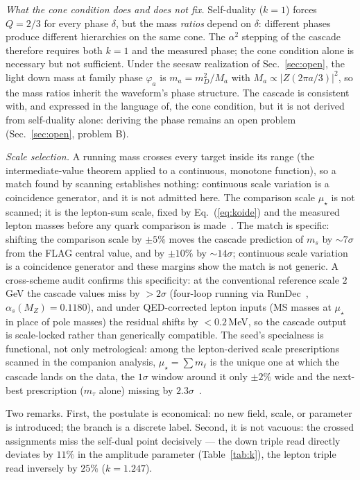 \documentclass[11pt]{article}
\begin{document}
\emph{What the cone condition does and does not fix.} Self-duality ($k=1$)
forces $Q = 2/3$ for every phase $\delta$, but the mass \emph{ratios} depend
on $\delta$: different phases produce different hierarchies on the same cone.
The $\alpha^2$ stepping of the cascade therefore requires both $k=1$ and the
measured phase; the cone condition alone is necessary but not sufficient.
Under the seesaw realization of Sec.~\ref{sec:open}, the light down mass at
family phase $\varphi_a$ is $m_a = m_D^2/M_a$ with
$M_a \propto |Z(2\pi a/3)|^2$, so the mass ratios inherit the waveform's
phase structure. The cascade is consistent with, and expressed in the
language of, the cone condition, but it is not derived from self-duality
alone: deriving the phase remains an open problem (Sec.~\ref{sec:open},
problem B).

\emph{Scale selection.} A running mass crosses every target inside its range
(the intermediate-value theorem applied to a continuous, monotone function),
so a match found by scanning establishes nothing: continuous scale variation
is a coincidence generator, and it is not admitted here. The comparison
scale $\mu_\star$ is not scanned; it is the lepton-sum scale, fixed by
Eq.~(\ref{eq:koide}) and the measured lepton masses before any quark
comparison is made~\cite{APPB}. The match is specific: shifting the comparison scale by $\pm5\%$ moves the cascade prediction of $m_s$ by $\sim7\sigma$ from the FLAG central value, and by $\pm10\%$ by $\sim14\sigma$; continuous scale variation is a coincidence generator and these margins show the match is not generic. A cross-scheme audit confirms this specificity: at the conventional
reference scale $2$\,GeV the cascade values miss by $>2\sigma$
(four-loop running via RunDec~\cite{CRunDec}, $\alpha_s(M_Z)=0.1180$),
and under QED-corrected lepton inputs (MS masses at $\mu_\star$ in
place of pole masses) the residual shifts by $<0.2$\,MeV, so the
cascade output is scale-locked rather than generically compatible.
The seed's specialness is functional, not only metrological: among the
lepton-derived scale prescriptions scanned in the companion analysis,
$\mu_\star = \sum m_\ell$ is the unique one at which the cascade lands on
the data, the $1\sigma$ window around it only $\pm2\%$ wide and the
next-best prescription ($m_\tau$ alone) missing by $2.3\sigma$~\cite{Prereg}.

Two remarks. First, the postulate is economical: no new field, scale, or parameter
is introduced; the branch is a discrete label. Second, it is not vacuous: the
crossed assignments miss the self-dual point decisively --- the down triple
read directly deviates by $11\%$ in the amplitude parameter
(Table~\ref{tab:k}), the lepton triple read inversely by $25\%$
($k = 1.247$).
\end{document}
